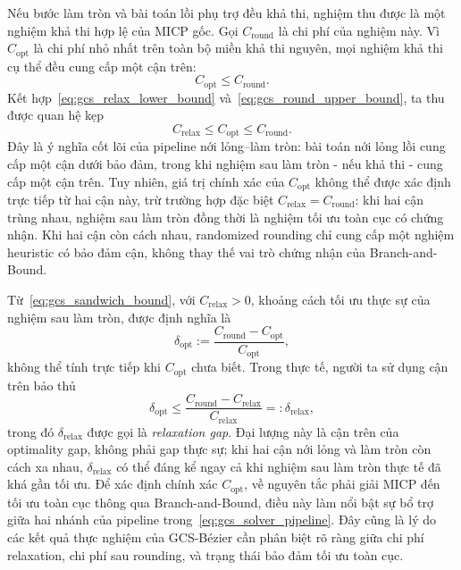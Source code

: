 Nếu bước làm tròn và bài toán lồi phụ trợ đều khả thi, nghiệm thu được là một nghiệm khả thi hợp lệ của MICP gốc.
Gọi $C_{\mathrm{round}}$ là chi phí của nghiệm này.
Vì $C_{\mathrm{opt}}$ là chi phí nhỏ nhất trên toàn bộ miền khả thi nguyên, mọi nghiệm khả thi cụ thể đều cung cấp một cận trên:
\begin{equation}
    C_{\mathrm{opt}} \le C_{\mathrm{round}}.
    \label{eq:gcs_round_upper_bound}
\end{equation}
Kết hợp~\eqref{eq:gcs_relax_lower_bound} và~\eqref{eq:gcs_round_upper_bound}, ta thu được quan hệ kẹp
\begin{equation}
    C_{\mathrm{relax}}
    \le
    C_{\mathrm{opt}}
    \le
    C_{\mathrm{round}}.
    \label{eq:gcs_sandwich_bound}
\end{equation}
Đây là ý nghĩa cốt lõi của pipeline nới lỏng--làm tròn: bài toán nới lỏng lồi cung cấp một cận dưới bảo đảm, trong khi nghiệm sau làm tròn - nếu khả thi - cung cấp một cận trên.
Tuy nhiên, giá trị chính xác của $C_{\mathrm{opt}}$ không thể được xác định trực tiếp từ hai cận này, trừ trường hợp đặc biệt $C_{\mathrm{relax}} = C_{\mathrm{round}}$: khi hai cận trùng nhau, nghiệm sau làm tròn đồng thời là nghiệm tối ưu toàn cục có chứng nhận.
Khi hai cận còn cách nhau, randomized rounding chỉ cung cấp một nghiệm heuristic có bảo đảm cận, không thay thế vai trò chứng nhận của Branch-and-Bound.

Từ~\eqref{eq:gcs_sandwich_bound}, với $C_{\mathrm{relax}} > 0$, khoảng cách tối ưu thực sự của nghiệm sau làm tròn, được định nghĩa là
\[
    \delta_{\mathrm{opt}}
    :=
    \frac{C_{\mathrm{round}} - C_{\mathrm{opt}}}{C_{\mathrm{opt}}},
\]
không thể tính trực tiếp khi $C_{\mathrm{opt}}$ chưa biết.
Trong thực tế, người ta sử dụng cận trên bảo thủ
\begin{equation}
    \delta_{\mathrm{opt}}
    \le
    \frac{C_{\mathrm{round}} - C_{\mathrm{relax}}}{C_{\mathrm{relax}}}
    =:
    \delta_{\mathrm{relax}},
    \label{eq:gcs_relax_gap_bound}
\end{equation}
trong đó $\delta_{\mathrm{relax}}$ được gọi là \emph{relaxation gap}.
Đại lượng này là cận trên của optimality gap, không phải gap thực sự; khi hai cận nới lỏng và làm tròn còn cách xa nhau, $\delta_{\mathrm{relax}}$ có thể đáng kể ngay cả khi nghiệm sau làm tròn thực tế đã khá gần tối ưu.
Để xác định chính xác $C_{\mathrm{opt}}$, về nguyên tắc phải giải MICP đến tối ưu toàn cục thông qua Branch-and-Bound, điều này làm nổi bật sự bổ trợ giữa hai nhánh của pipeline trong~\eqref{eq:gcs_solver_pipeline}.
Đây cũng là lý do các kết quả thực nghiệm của GCS-Bézier cần phân biệt rõ ràng giữa chi phí relaxation, chi phí sau rounding, và trạng thái bảo đảm tối ưu toàn cục.
